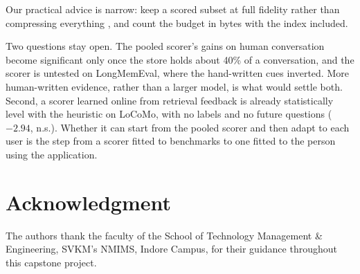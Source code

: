 Our practical advice is narrow: keep a scored subset at full fidelity rather
than compressing everything \cite{jiang2023llmlingua,ge2024icae}, and count
the budget in bytes with the index included.

Two questions stay open. The pooled scorer's gains on human conversation
become significant only once the store holds about 40\% of a conversation,
and the scorer is untested on LongMemEval, where the hand-written cues
inverted. More human-written evidence, rather than a larger model, is what
would settle both. Second, a scorer learned online from retrieval feedback is
already statistically level with the heuristic on LoCoMo, with no labels and
no future questions ($-2.94$, n.s.). Whether it can start from the pooled
scorer and then adapt to each user is the step from a scorer fitted to
benchmarks to one fitted to the person using the application.

\section*{Acknowledgment}
The authors thank the faculty of the School of Technology Management \&
Engineering, SVKM's NMIMS, Indore Campus, for their guidance throughout this
capstone project.
